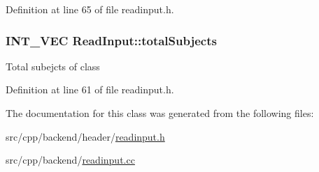 Definition at line 65 of file readinput.\-h.

\hypertarget{classReadInput_ad615390a3c9548b63e6081459801d3b3}{
\subsubsection[{total\-Subjects}]{\setlength{\rightskip}{0pt plus 5cm}I\-N\-T\-\_\-\-V\-E\-C Read\-Input\-::total\-Subjects\hspace{0.3cm}{\ttfamily [protected]}}}\label{classReadInput_ad615390a3c9548b63e6081459801d3b3}
Total subejcts of class 

Definition at line 61 of file readinput.\-h.



The documentation for this class was generated from the following files\-:\begin{DoxyCompactItemize}
\item 
src/cpp/backend/header/\hyperlink{readinput_8h}{readinput.\-h}\item 
src/cpp/backend/\hyperlink{readinput_8cc}{readinput.\-cc}\end{DoxyCompactItemize}
